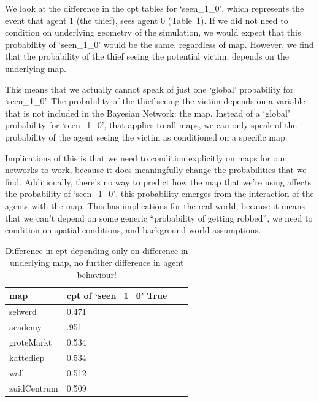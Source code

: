 \begin{enumerate}
We look at the difference in the cpt tables for `seen\_1\_0', which represents the event that agent 1 (the thief), sees agent 0 (Table~\ref{mapstab}). If we did not need to condition on underlying geometry of the simulation, we would expect that this probability of `seen\_1\_0' would be the same, regardless of map. However, we find that the probability of the thief seeing the potential victim, depends on the underlying map. 

This means that we actually cannot speak of just one `global' probability for `seen\_1\_0'. The probability of the thief seeing the victim depends on a variable that is not included in the Bayesian Network: the map. Instead of a `global' probability for `seen\_1\_0', that applies to all maps, we can only speak of the probability of the agent seeing the victim as conditioned on a specific map. 

Implications of this is that we need to condition explicitly on maps for our networks to work, because it does meaningfully change the probabilities that we find. Additionally, there's no way to predict how the map that we're using affects the probability of `seen\_1\_0', this probability emerges from the interaction of the agents with the map. This has implications for the real world, because it means that we can't depend on some generic ``probability of getting robbed'', we need to condition on spatial conditions, and background world assumptions.

\begin{table}[htbp]
\begin{tabular}{llll}
map &  cpt of `seen\_1\_0' True \\
\hline
selwerd&  0.471\\
academy & .951\\
groteMarkt & 0.534\\
kattediep &0.534\\
wall &  0.512\\
zuidCentrum & 0.509\\
\end{tabular}
\caption{Difference in cpt depending only on difference in underlying map, no further difference in agent behaviour!}
\label{mapstab}
\end{table}




\end{enumerate}
